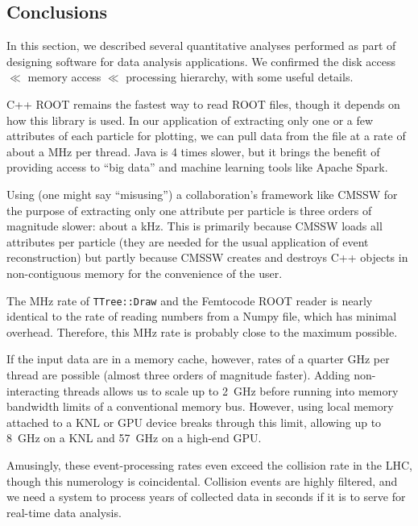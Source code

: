 \documentclass[12pt]{article}
\begin{document}
\subsection*{Conclusions}

In this section, we described several quantitative analyses performed as part of designing software for data analysis applications. We confirmed the disk access $\ll$ memory access $\ll$ processing hierarchy, with some useful details.

C++ ROOT remains the fastest way to read ROOT files, though it depends on how this library is used. In our application of extracting only one or a few attributes of each particle for plotting, we can pull data from the file at a rate of about a MHz per thread. Java is 4 times slower, but it brings the benefit of providing access to ``big data'' and machine learning tools like Apache Spark.

Using (one might say ``misusing'') a collaboration's framework like CMSSW for the purpose of extracting only one attribute per particle is three orders of magnitude slower: about a kHz. This is primarily because CMSSW loads all attributes per particle (they are needed for the usual application of event reconstruction) but partly because CMSSW creates and destroys C++ objects in non-contiguous memory for the convenience of the user.

The MHz rate of {\tt TTree::Draw} and the Femtocode ROOT reader is nearly identical to the rate of reading numbers from a Numpy file, which has minimal overhead. Therefore, this MHz rate is probably close to the maximum possible.

If the input data are in a memory cache, however, rates of a quarter GHz per thread are possible (almost three orders of magnitude faster). Adding non-interacting threads allows us to scale up to 2~GHz before running into memory bandwidth limits of a conventional memory bus. However, using local memory attached to a KNL or GPU device breaks through this limit, allowing up to 8~GHz on a KNL and 57~GHz on a high-end GPU.

Amusingly, these event-processing rates even exceed the collision rate in the LHC, though this numerology is coincidental. Collision events are highly filtered, and we need a system to process years of collected data in seconds if it is to serve for real-time data analysis.
\end{document}
